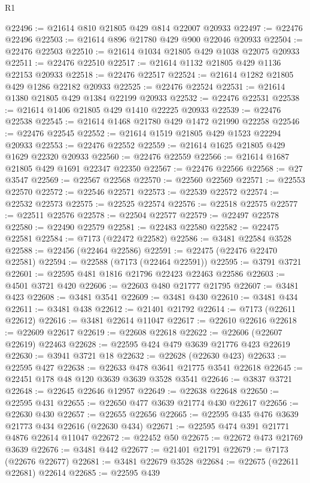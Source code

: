 \begin{lexlean}{R1}
\begin{coremodule}
@22496 := @21614 @810 @21805 @429 @814 @22007 @20933
@22497 := @22476 @22496
@22503 := @21614 @896 @21780 @429 @900 @22046 @20933
@22504 := @22476 @22503
@22510 := @21614 @1034 @21805 @429 @1038 @22075 @20933
@22511 := @22476 @22510
@22517 := @21614 @1132 @21805 @429 @1136 @22153 @20933
@22518 := @22476 @22517
@22524 := @21614 @1282 @21805 @429 @1286 @22182 @20933
@22525 := @22476 @22524
@22531 := @21614 @1380 @21805 @429 @1384 @22199 @20933
@22532 := @22476 @22531
@22538 := @21614 @1406 @21805 @429 @1410 @22225 @20933
@22539 := @22476 @22538
@22545 := @21614 @1468 @21780 @429 @1472 @21990 @22258
@22546 := @22476 @22545
@22552 := @21614 @1519 @21805 @429 @1523 @22294 @20933
@22553 := @22476 @22552
@22559 := @21614 @1625 @21805 @429 @1629 @22320 @20933
@22560 := @22476 @22559
@22566 := @21614 @1687 @21805 @429 @1691 @22347 @22350
@22567 := @22476 @22566
@22568 := @27 @3547
@22569 := @22567 @22568
@22570 := @22560 @22569
@22571 := @22553 @22570
@22572 := @22546 @22571
@22573 := @22539 @22572
@22574 := @22532 @22573
@22575 := @22525 @22574
@22576 := @22518 @22575
@22577 := @22511 @22576
@22578 := @22504 @22577
@22579 := @22497 @22578
@22580 := @22490 @22579
@22581 := @22483 @22580
@22582 := @22475 @22581
@22584 := @7173 (@22472 @22582)
@22586 := @3481 @22584 @3528
@22588 := @22456 (@22464 @22586)
@22591 := @22475 (@22476 @22470 @22581)
@22594 := @22588 (@7173 (@22464 @22591))
@22595 := @3791 @3721
@22601 := @22595 @481 @1816 @21796 @22423 @22463 @22586
@22603 := @4501 @3721 @420
@22606 := @22603 @480 @21777 @21795
@22607 := @3481 @423
@22608 := @3481 @3541
@22609 := @3481 @430
@22610 := @3481 @434
@22611 := @3481 @438
@22612 := @21401 @21792
@22614 := @7173 (@22611 @22612)
@22616 := @3481 @22614 @11047
@22617 := @22610 @22616
@22618 := @22609 @22617
@22619 := @22608 @22618
@22622 := @22606 (@22607 @22619) @22463
@22628 := @22595 @424 @479 @3639 @21776 @423 @22619
@22630 := @3941 @3721 @18
@22632 := @22628 (@22630 @423)
@22633 := @22595 @427
@22638 := @22633 @478 @3641 @21775 @3541 @22618
@22645 := @22451 @178 @48 @120 @3639 @3639 @3528 @3541
@22646 := @3837 @3721
@22648 := @22645 @22646 @12957
@22649 := @22638 @22648
@22650 := @22595 @431
@22655 := @22650 @477 @3639 @21774 @430 @22617
@22656 := @22630 @430
@22657 := @22655 @22656
@22665 := @22595 @435 @476 @3639 @21773 @434 @22616 (@22630 @434)
@22671 := @22595 @474 @391 @21771 @4876 @22614 @11047
@22672 := @22452 @50
@22675 := @22672 @473 @21769 @3639
@22676 := @3481 @442
@22677 := @21401 @21791
@22679 := @7173 (@22676 @22677)
@22681 := @3481 @22679 @3528
@22684 := @22675 (@22611 @22681) @22614
@22685 := @22595 @439

\end{coremodule}
\end{lexlean}
